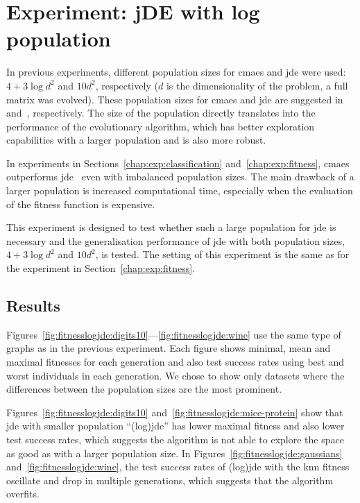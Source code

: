 \section{Experiment: jDE with log population} \label{chap:exp:logjde}
In previous experiments, different population sizes for \ac{cmaes} and \ac{jde} were used: $4+3\log{d^2}$ and $10d^2$, respectively ($d$ is the dimensionality of the problem, a full matrix was evolved). These population sizes for \ac{cmaes} and \ac{jde} are suggested in~\citep{hansen2001completely} and~\citep{brest2006self}, respectively. The size of the population directly translates into the performance of the evolutionary algorithm, which has better exploration capabilities with a larger population and is also more robust.

In experiments in Sections~\ref{chap:exp:classification} and~\ref{chap:exp:fitness}, \ac{cmaes} outperforms \ac{jde}~\citep{fukui2013evolutionary} even with imbalanced population sizes. The main drawback of a larger population is increased computational time, especially when the evaluation of the fitness function is expensive.

This experiment is designed to test whether such a large population for \ac{jde} is necessary and the generalisation performance of \ac{jde} with both population sizes, $4+3\log{d^2}$ and $10d^2$, is tested. The setting of this experiment is the same as for the experiment in Section~\ref{chap:exp:fitness}.

\subsection{Results}

Figures~\ref{fig:fitnesslogjde:digits10}---\ref{fig:fitnesslogjde:wine} use the same type of graphs as in the previous experiment. Each figure shows minimal, mean and maximal fitnesses for each generation and also test success rates using best and worst individuals in each generation. We chose to show only datasets where the differences between the population sizes are the most prominent.

Figures~\ref{fig:fitnesslogjde:digits10} and~\ref{fig:fitnesslogjde:mice-protein} show that \ac{jde} with smaller population ``(log)\ac{jde}'' has lower maximal fitness and also lower test success rates, which suggests the algorithm is not able to explore the space as good as with a larger population size. In Figures~\ref{fig:fitnesslogjde:gaussians} and~\ref{fig:fitnesslogjde:wine}, the test success rates of (log)\ac{jde} with the \ac{knn} fitness oscillate and drop in multiple generations, which suggests that the algorithm overfits.

